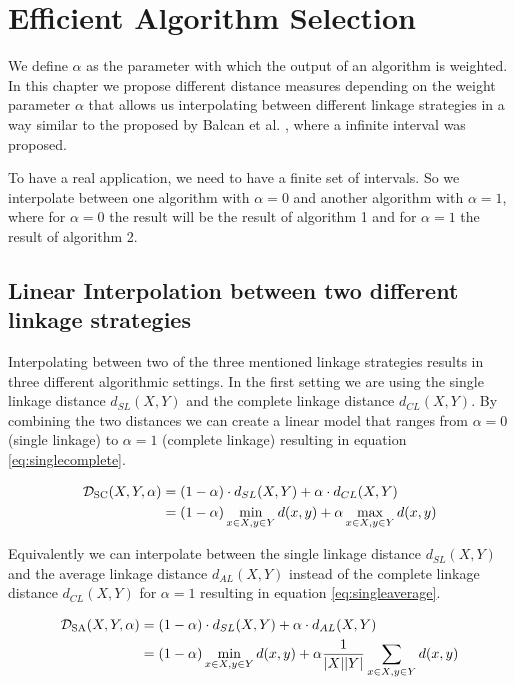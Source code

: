 \chapter{Efficient Algorithm Selection}
\label{chapter:alphalinkage}

We define $\alpha$ as the parameter with which the output of an algorithm is weighted. In this chapter we propose different distance measures depending on the weight parameter $\alpha$ that allows us interpolating between different linkage strategies in a way similar to the proposed by Balcan et al. \cite{DBLP:journals/corr/BalcanNVW16}, where a infinite interval was proposed.

To have a real application, we need to have a finite set of intervals. So we interpolate between one algorithm with $\alpha = 0$ and another algorithm with $\alpha = 1$, where for $\alpha = 0$ the result will be the result of algorithm 1 and for $\alpha = 1$ the result of algorithm 2.

\section{Linear Interpolation between two different linkage strategies}

Interpolating between two of the three mentioned linkage strategies results in three different algorithmic settings. In the first setting we are using the single linkage distance $d_{SL}(X,Y)$ and the complete linkage distance $d_{CL}(X,Y)$. By combining the two distances we can create a linear model that ranges from $\alpha = 0$ (single linkage) to $\alpha = 1$ (complete linkage) resulting in equation \ref{eq:singlecomplete}.

\begin{equation}
    \begin{aligned}
        \mathcal{D}_\text{SC}(X,Y,\alpha) &= (1 - \alpha) \cdot d_{SL}(X,Y) + \alpha \cdot d_{CL}(X,Y)\\
        &= (1 - \alpha) \min\limits_{x \in X, y \in Y} d(x,y) + \alpha \max\limits_{x \in X, y \in Y} d(x,y)
    \end{aligned}
    \label{eq:singlecomplete}
\end{equation}

Equivalently we can interpolate between the single linkage distance $d_{SL}(X,Y)$ and the average linkage distance $d_{AL}(X,Y)$ instead of the complete linkage distance $d_{CL}(X,Y)$ for $\alpha = 1$ resulting in equation \ref{eq:singleaverage}. 

\begin{equation}
    \begin{aligned}
        \mathcal{D}_\text{SA}(X,Y,\alpha) &= (1 - \alpha) \cdot d_{SL}(X,Y) + \alpha \cdot d_{AL}(X,Y)\\
        &= (1 - \alpha) \min\limits_{x \in X, y \in Y} d(x,y) + \alpha \frac{1}{|X| |Y|}\sum\limits_{x \in X, y \in Y} d(x,y)
    \end{aligned}
    \label{eq:singleaverage}
\end{equation}

